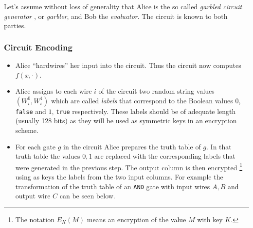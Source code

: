 Let's assume without loss of generality that Alice is the so called \textit{garbled circuit generator
}, or \textit{garbler}, and Bob the \textit{evaluator}. The circuit is known to both parties.

\subsubsection{Circuit Encoding}

\begin{itemize}
  \item Alice ``hardwires'' her input into the circuit. Thus the circuit now computes $f(x, \cdot)$.
  \item Alice assigns to each wire $i$ of the circuit two random string values $(W_i^0, W_i^1)$ which are called \textit{labels} that correspond to the Boolean values $0$, \texttt{false} and $1$, \texttt{true} respectively. These labels should be of adequate length (usually 128 bits) as they will be used as symmetric keys in an encryption scheme.
  \item For each gate $g$ in the circuit Alice prepares the truth table of $g$. In that truth table the values $0,1$ are replaced with the corresponding labels that were generated in the previous step. The output column is then encrypted \footnote{The notation $E_{K}(M)$ means an encryption of the value $M$ with key $K$.} using as keys the labels from the two input columns.
  For example the transformation of the truth table of an \texttt{AND} gate with input wires $A,B$ and output wire $C$ can be seen below.


\end{itemize}
